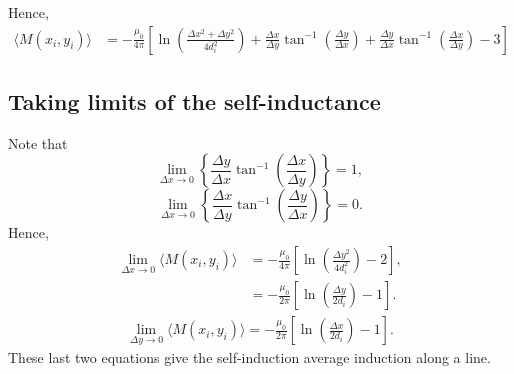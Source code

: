 \documentclass{article}
\begin{document}
Hence,
\[
\boxed{\begin{aligned}
\langle M(x_i, y_i) \rangle  &= -\frac{\mu_0}{4\pi}\left[\ln\left(\frac{\Delta x^2+\Delta y^2}{4d_i^2}\right) + \frac{\Delta x}{\Delta y}\tan^{-1}\left(\frac{\Delta y}{\Delta x}\right) 
+  \frac{\Delta y}{\Delta x}\tan^{-1}\left(\frac{\Delta x}{\Delta y}\right) - 3\right]
\end{aligned}}\]

\subsection{Taking limits of the self-inductance}

Note that
\[\lim_{\Delta x\rightarrow0}\left\{\frac{\Delta y}{\Delta x}\tan^{-1}\left(\frac{\Delta x}{\Delta y}\right)\right\} = 1,\]
\[\lim_{\Delta x\rightarrow0}\left\{\frac{\Delta x}{\Delta y}\tan^{-1}\left(\frac{\Delta y}{\Delta x}\right)\right\} = 0.\]
Hence,
\[\begin{aligned}
\lim_{\Delta x\rightarrow0}\langle M(x_i, y_i) \rangle &= -\frac{\mu_0}{4\pi}\left[\ln\left(\frac{\Delta y^2}{4d_i^2}\right) - 2\right], \\
&= -\frac{\mu_0}{2\pi}\left[\ln\left(\frac{\Delta y}{2d_i}\right) - 1\right].
\end{aligned}\]
\[\begin{aligned}
\lim_{\Delta y\rightarrow0}\langle M(x_i, y_i) \rangle = -\frac{\mu_0}{2\pi}\left[\ln\left(\frac{\Delta x}{2d_i}\right) - 1\right].
\end{aligned}\]
These last two equations give the self-induction average induction along a line.
\end{document}
